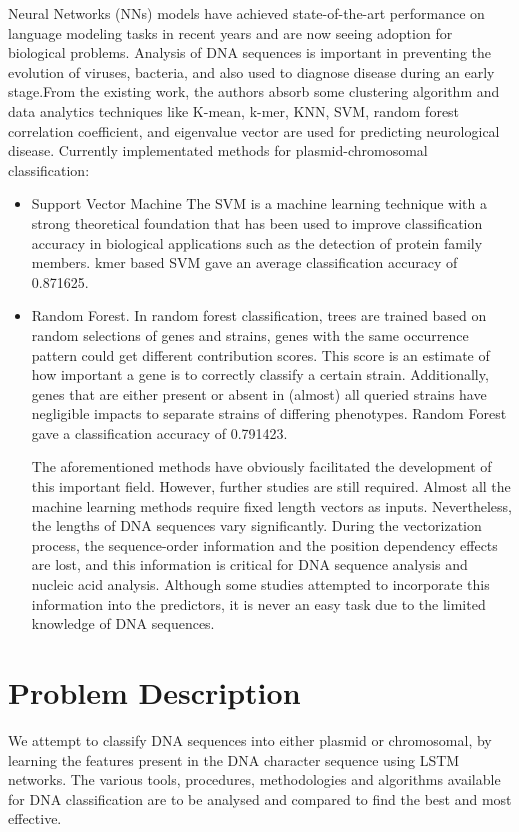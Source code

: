 \documentclass[conference]{IEEEtran}
\begin{document}
Neural Networks (NNs) models have achieved state-of-the-art performance on language modeling tasks in recent years and are now seeing adoption for biological problems. Analysis of DNA sequences is important in preventing the evolution of viruses, bacteria, and also used to diagnose disease during an early stage.From the existing work, the authors absorb some clustering algorithm and data analytics techniques like K-mean, k-mer, KNN, SVM, random forest correlation coefficient, and eigenvalue vector are used for predicting neurological disease. \newline
Currently implementated methods for plasmid-chromosomal classification:
\begin{itemize}
    \item Support Vector Machine\newline
    The SVM is a machine learning technique with a strong theoretical foundation that has been used to improve classification accuracy in biological applications such as the detection of protein family members. kmer based SVM gave an average classification accuracy of 0.871625.

    \item Random Forest.\newline
    In random forest classification, trees are trained based on random selections of genes and strains, genes with the same occurrence pattern could get different contribution scores. This score is an estimate of how important a gene is to correctly classify a certain strain. Additionally, genes that are either present or absent in (almost) all queried strains have negligible impacts to separate strains of differing phenotypes. Random Forest gave a classification accuracy of 0.791423.
\newline

The aforementioned methods have obviously facilitated the development of this important field. However, further studies are still required. Almost all the machine learning methods require fixed length vectors as inputs. Nevertheless, the lengths of DNA sequences vary significantly. During the vectorization process, the sequence-order information and the position dependency effects are lost, and this information is critical for DNA sequence analysis and nucleic acid analysis. Although some studies attempted to incorporate this information into the predictors, it is never an easy task due to the limited knowledge of DNA sequences.
\end{itemize}

\section{Problem Description}
We attempt to classify DNA sequences into either plasmid or chromosomal, by learning the features present in the DNA character sequence using LSTM networks.
The various tools, procedures, methodologies and algorithms available for DNA classification are to be analysed  and compared to find the best and most effective. 
\end{document}
